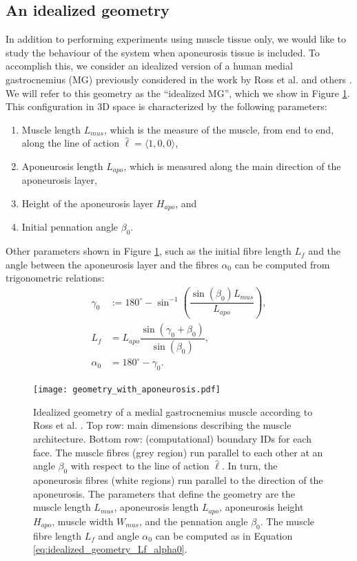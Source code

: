 \documentclass{sfuthesis}
\numberwithin{equation}{section}
\numberwithin{figure}{chapter}
\numberwithin{table}{chapter}
\theoremstyle{definition}
\begin{document}
\subsection{An idealized geometry}

In addition to performing experiments using muscle tissue only, we would like to study the behaviour of the system when aponeurosis tissue is included. To accomplish this, we consider an idealized version of a human medial gastrocnemius (MG) previously considered in the work by Ross et al. \cite{Paper3_RossEtAl2021} and others \cite{Seba,Hadi}. We will refer to this geometry as the ``idealized MG'', which we show in Figure \ref{fig:idealized_geometry}. This configuration in 3D space is characterized by the following parameters:
\begin{enumerate}
    \item Muscle length $L_{mus}$, which is the measure of the muscle, from end to end, along the line of action $\widehat{\bm{\ell}} = \langle 1,0,0 \rangle$,
    \item Aponeurosis length $L_{apo}$, which is measured along the main direction of the aponeurosis layer,
    \item Height of the aponeurosis layer $H_{apo}$, and
    \item Initial pennation angle $\beta_0$.
\end{enumerate}

Other parameters shown in Figure \ref{fig:idealized_geometry}, such as the initial fibre length $L_f$ and the angle between the aponeurosis layer and the fibres $\alpha_0$ can be computed from trigonometric relations:
\begin{subequations} \label{eq:idealized_geometry_Lf_alpha0}
    \begin{align}
        \gamma_0 &:= 180^\circ - \sin^{-1} \left(\dfrac{\sin(\beta_0) L_{mus}}{L_{apo}} \right), \\
        L_f &= L_{apo} \dfrac{\sin(\gamma_0 + \beta_0)}{\sin(\beta_0)}, \\
        \alpha_0 &= 180^\circ - \gamma_0.
    \end{align}
\end{subequations}

\begin{figure}
    \centering
    \texttt{[image: geometry\_with\_aponeurosis.pdf]}
    \caption{Idealized geometry of a medial gastrocnemius muscle according to Ross et al. \cite{Paper3_RossEtAl2021}. Top row: main dimensions describing the muscle architecture. Bottom row: (computational) boundary IDs for each face. The muscle fibres (grey region) run parallel to each other at an angle $\beta_0$ with respect to the line of action $\widehat{\bm{\ell}}$. In turn, the aponeurosis fibres (white regions) run parallel to the direction of the aponeurosis. The parameters that define the geometry are the muscle length $L_{mus}$, aponeurosis length $L_{apo}$, aponeurosis height $H_{apo}$, muscle width $W_{mus}$, and the pennation angle $\beta_0$. The muscle fibre length $L_f$ and angle $\alpha_0$ can be computed as in Equation \eqref{eq:idealized_geometry_Lf_alpha0}. 
    \label{fig:idealized_geometry}}
\end{figure}
\end{document}
